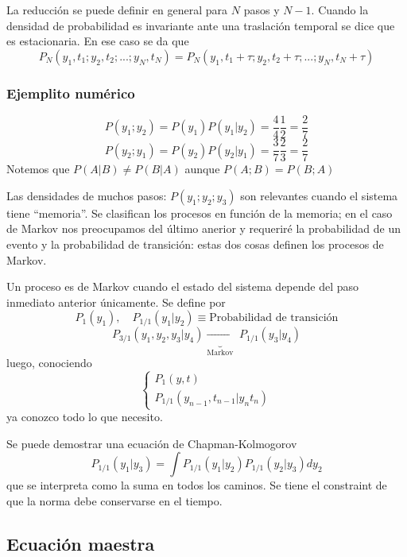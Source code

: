 \documentclass[10pt,oneside]{CBFT_book}
\begin{document}
La reducción se puede definir en general para $N$ pasos y $N-1$.
Cuando la densidad de probabilidad es invariante ante una traslación temporal se dice que es estacionaria.
En ese caso se da que
\[
	P_N(y_1,t_1;y_2,t_2; ...; y_N,t_N) = P_N(y_1,t_1+\tau;y_2,t_2+\tau; ...; y_N,t_N+\tau) 
\]

\subsubsection{Ejemplito numérico}

\[
	P(y_1;y_2) = P(y_1)P(y_1|y_2) = \frac{4}{4}\frac{1}{2} = \frac{2}{7}
\]
\[
	P(y_2;y_1) = P(y_2)P(y_2|y_1)  = \frac{3}{7}\frac{2}{3} = \frac{2}{7}
\]
Notemos que $P(A|B) \neq P(B|A)$ aunque $P(A;B) = P(B;A)$

Las densidades de muchos pasos: $P(y_1;y_2;y_3)$ son relevantes cuando el sistema tiene ``memoria''.
Se clasifican los procesos en función de la memoria; en el caso de Markov nos preocupamos del último
anerior y requeriré la probabilidad de un evento y la probabilidad de transición: estas dos cosas
definen los procesos de Markov.

Un proceso es de Markov cuando el estado del sistema depende del paso inmediato anterior únicamente.
Se define por 
\[
	P_1(y_1) , \quad P_{1/1}(y_1|y_2) \equiv \text{Probabilidad de transición} 
\]
\[
	P_{3/1}(y_1,y_2,y_3|y_4) \underbrace{\rightarrow}_{\text{Markov}} \; P_{1/1}(y_3|y_4)
\]
luego, conociendo
\[
	\begin{cases}
	P_1 ( y, t )  \\
	P_{1/1}( y_{n-1}, t_{n-1} | y_n t_n )
	\end{cases}
\]
ya conozco todo lo que necesito.


Se puede demostrar una ecuación de Chapman-Kolmogorov
\[
	P_{1/1}(y_1|y_3) = \int P_{1/1}(y_1|y_2) P_{1/1}(y_2|y_3) dy_2
\]
que se interpreta como la suma en todos los caminos. Se tiene el constraint de que la norma debe
conservarse en el tiempo.

\subsection{Ecuación maestra}
\end{document}
